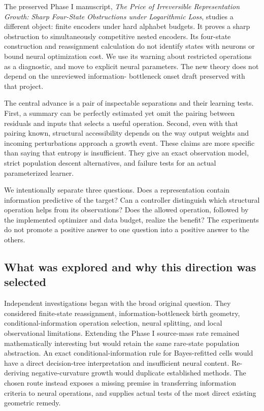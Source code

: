 \documentclass[11pt]{article}
\theoremstyle{remark}\newtheorem{remark}[theorem]{Remark}
\begin{document}
The preserved Phase I manuscript, \emph{The Price of Irreversible
Representation Growth: Sharp Four-State Obstructions under Logarithmic Loss},
studies a different object: finite encoders under hard alphabet budgets.
It proves a sharp obstruction to simultaneously competitive nested encoders.
Its four-state construction and reassignment calculation do not identify
states with neurons or bound neural optimization cost. We use its warning
about restricted operations as a diagnostic, and move to explicit neural
parameters. The new theory does not depend on the unreviewed information-
bottleneck onset draft preserved with that project.

The central advance is a pair of inspectable separations and their learning
tests. First, a summary can be perfectly estimated yet omit the pairing
between residuals and inputs that selects a useful operation. Second, even
with that pairing known, structural accessibility depends on the way output
weights and incoming perturbations approach a growth event. These claims are
more specific than saying that entropy is insufficient. They give an exact
observation model, strict population descent alternatives, and failure tests
for an actual parameterized learner.

We intentionally separate three questions. Does a representation contain
information predictive of the target? Can a controller distinguish which
structural operation helps from its observations? Does the allowed operation,
followed by the implemented optimizer and data budget, realize the benefit?
The experiments do not promote a positive answer to one question into a
positive answer to the others.

\subsection{What was explored and why this direction was selected}
Independent investigations began with the broad original question. They
considered finite-state reassignment, information-bottleneck birth geometry,
conditional-information operation selection, neural splitting, and local
observational limitations. Extending the Phase I source-mass rate remained
mathematically interesting but would retain the same rare-state population
abstraction. An exact conditional-information rule for Bayes-refitted cells
would have a direct decision-tree interpretation and insufficient neural
content. Re-deriving negative-curvature growth would duplicate established
methods. The chosen route instead exposes a missing premise in transferring
information criteria to neural operations, and supplies actual tests of the
most direct existing geometric remedy.
\end{document}
